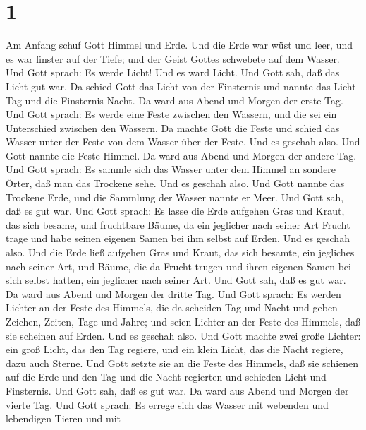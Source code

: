 \hypertarget{section}{%
\section{1}\label{section}}

 Am Anfang schuf Gott Himmel und Erde.  Und die
Erde war wüst und leer, und es war finster auf der Tiefe; und der Geist
Gottes schwebete auf dem Wasser.  Und Gott sprach: Es werde
Licht! Und es ward Licht.  Und Gott sah, daß das Licht gut
war. Da schied Gott das Licht von der Finsternis  und nannte
das Licht Tag und die Finsternis Nacht. Da ward aus Abend und Morgen der
erste Tag.  Und Gott sprach: Es werde eine Feste zwischen
den Wassern, und die sei ein Unterschied zwischen den Wassern.
 Da machte Gott die Feste und schied das Wasser unter der
Feste von dem Wasser über der Feste. Und es geschah also. 
Und Gott nannte die Feste Himmel. Da ward aus Abend und Morgen der
andere Tag.  Und Gott sprach: Es sammle sich das Wasser
unter dem Himmel an sondere Örter, daß man das Trockene sehe. Und es
geschah also.  Und Gott nannte das Trockene Erde, und die
Sammlung der Wasser nannte er Meer. Und Gott sah, daß es gut war.
 Und Gott sprach: Es lasse die Erde aufgehen Gras und
Kraut, das sich besame, und fruchtbare Bäume, da ein jeglicher nach
seiner Art Frucht trage und habe seinen eigenen Samen bei ihm selbst auf
Erden. Und es geschah also.  Und die Erde ließ aufgehen
Gras und Kraut, das sich besamte, ein jegliches nach seiner Art, und
Bäume, die da Frucht trugen und ihren eigenen Samen bei sich selbst
hatten, ein jeglicher nach seiner Art. Und Gott sah, daß es gut war.
 Da ward aus Abend und Morgen der dritte Tag. 
Und Gott sprach: Es werden Lichter an der Feste des Himmels, die da
scheiden Tag und Nacht und geben Zeichen, Zeiten, Tage und Jahre;
 und seien Lichter an der Feste des Himmels, daß sie
scheinen auf Erden. Und es geschah also.  Und Gott machte
zwei große Lichter: ein groß Licht, das den Tag regiere, und ein klein
Licht, das die Nacht regiere, dazu auch Sterne.  Und Gott
setzte sie an die Feste des Himmels, daß sie schienen auf die Erde
 und den Tag und die Nacht regierten und schieden Licht und
Finsternis. Und Gott sah, daß es gut war.  Da ward aus
Abend und Morgen der vierte Tag.  Und Gott sprach: Es
errege sich das Wasser mit webenden und lebendigen Tieren und mit
